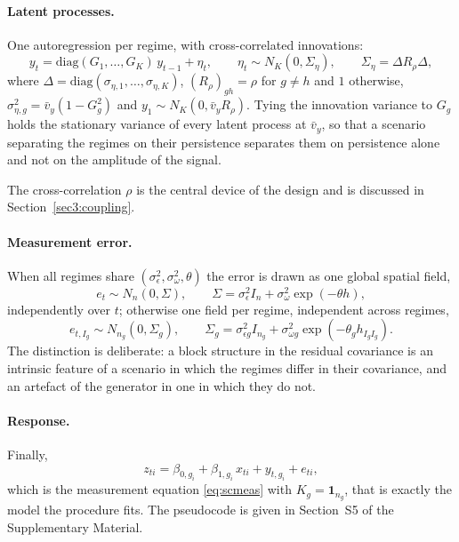 \paragraph{Latent processes.} One autoregression per regime, with cross-correlated innovations:
\begin{equation}
  y_t = \mathrm{diag}(G_1,\dots,G_K)\,y_{t-1} + \eta_t,
  \qquad \eta_t \sim N_K(0, \Sigma_\eta),
  \qquad \Sigma_\eta = \Delta R_\rho \Delta,
  \label{eq:dgplatent}
\end{equation}
where $\Delta = \mathrm{diag}(\sigma_{\eta,1},\dots,\sigma_{\eta,K})$, $(R_\rho)_{gh} = \rho$ for $g \neq h$ and $1$ otherwise, $\sigma^2_{\eta,g} = \bar v_y (1-G_g^2)$ and $y_1 \sim N_K(0, \bar v_y R_\rho)$. Tying the innovation variance to $G_g$ holds the stationary variance of every latent process at $\bar v_y$, so that a scenario separating the regimes on their persistence separates them on persistence alone and not on the amplitude of the signal.

The cross-correlation $\rho$ is the central device of the design and is discussed in Section~\ref{sec3:coupling}.

\paragraph{Measurement error.} When all regimes share $(\sigma^2_\epsilon, \sigma^2_\omega, \theta)$ the error is drawn as one global spatial field,
\begin{equation}
  e_t \sim N_n(0, \Sigma), \qquad
  \Sigma = \sigma^2_\epsilon I_n + \sigma^2_\omega \exp(-\theta h),
  \label{eq:dgperr}
\end{equation}
independently over $t$; otherwise one field per regime, independent across regimes,
\begin{equation}
  e_{t,I_g} \sim N_{n_g}(0, \Sigma_g), \qquad
  \Sigma_g = \sigma^2_{\epsilon g} I_{n_g}
           + \sigma^2_{\omega g} \exp(-\theta_g h_{I_g I_g}).
  \label{eq:dgperrg}
\end{equation}
The distinction is deliberate: a block structure in the residual covariance is an intrinsic feature of a scenario in which the regimes differ in their covariance, and an artefact of the generator in one in which they do not.

\paragraph{Response.} Finally,
\begin{equation}
  z_{ti} = \beta_{0,g_i} + \beta_{1,g_i}\,x_{ti} + y_{t,g_i} + e_{ti},
  \label{eq:dgpz}
\end{equation}
which is the measurement equation \eqref{eq:scmeas} with $K_g = \mathbf{1}_{n_g}$, that is exactly the model the procedure fits. The pseudocode is given in Section~S5 of the Supplementary Material.

